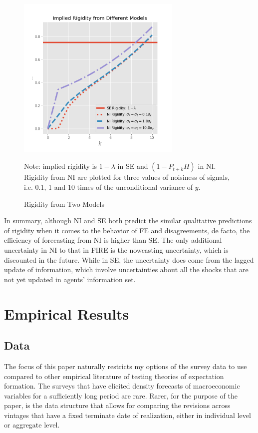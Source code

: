 \documentclass[12pt]{article}
\begin{document}
	\begin{figure}[ht]
		\centering
		\includegraphics[width=0.7\textwidth]{figures/rigidity.png} 
		\begin{flushleft}
			{\footnotesize Note: implied rigidity is $1-\lambda$ in SE and $(1-P_{t+k}H)$ in NI. Rigidity from NI are plotted for three values of noisiness of signals, i.e. 0.1, 1 and 10 times of the unconditional variance of $y$. }
		\end{flushleft}
		\caption{Rigidity from Two Models}
		\label{rigidity}
	\end{figure}
	
	In summary, although NI and SE both predict the similar qualitative predictions of rigidity when it comes to the behavior of FE and disagreements, de facto, the efficiency of forecasting from NI is higher than SE. The only additional uncertainty in NI to that in FIRE is the nowcasting uncertainty, which is discounted in the future. While in SE, the uncertainty does come from the lagged update of information, which involve uncertainties about all the shocks that are not yet updated in agents' information set. 
		
	
	\section{Empirical Results}\label{empirical}
	
	\subsection{Data}
	
	The focus of this paper naturally restricts my options of the survey data to use compared to other empirical literature of testing theories of expectation formation.  The surveys that have elicited density forecasts of macroeconomic variables for a sufficiently long period are rare. Rarer, for the purpose of the paper, is the data structure that allows for comparing the revisions across vintages that have a fixed terminate date of realization, either in individual level or aggregate level. 
	
\end{document}
